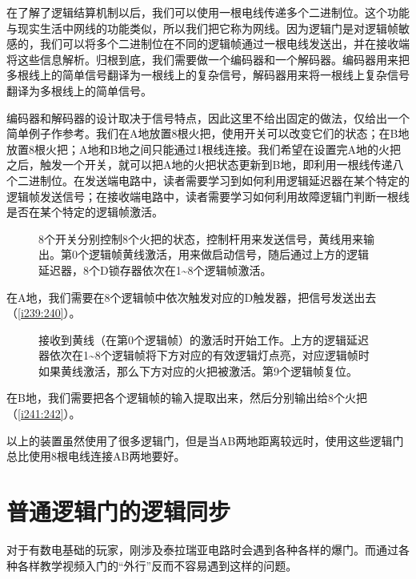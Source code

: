 在了解了逻辑结算机制以后，我们可以使用一根电线传递多个二进制位。这个功能与现实生活中网线的功能类似，所以我们把它称为网线。因为逻辑门是对逻辑帧敏感的，我们可以将多个二进制位在不同的逻辑帧通过一根电线发送出，并在接收端将这些信息解析。归根到底，我们需要做一个编码器和一个解码器。编码器用来把多根线上的简单信号翻译为一根线上的复杂信号，解码器用来将一根线上复杂信号翻译为多根线上的简单信号。

编码器和解码器的设计取决于信号特点，因此这里不给出固定的做法，仅给出一个简单例子作参考。我们在A地放置8根火把，使用开关可以改变它们的状态；在B地放置8根火把；A地和B地之间只能通过1根线连接。我们希望在设置完A地的火把之后，触发一个开关，就可以把A地的火把状态更新到B地，即利用一根线传递八个二进制位。在发送端电路中，读者需要学习到如何利用逻辑延迟器在某个特定的逻辑帧发送信号；在接收端电路中，读者需要学习如何利用故障逻辑门判断一根线是否在某个特定的逻辑帧激活。

\begin{figure}[!ht]
  \centering
  \caption{8个开关分别控制8个火把的状态，控制杆用来发送信号，黄线用来输出。第0个逻辑帧黄线激活，用来做启动信号，随后通过上方的逻辑延迟器，8个D锁存器依次在1\~{}8个逻辑帧激活。}
  \label{i239:240}
\end{figure}

在A地，我们需要在8个逻辑帧中依次触发对应的D触发器，把信号发送出去（\autoref{i239:240}）。

\begin{figure}[!ht]
  \centering
  \caption{接收到黄线（在第0个逻辑帧）的激活时开始工作。上方的逻辑延迟器依次在1\~{}8个逻辑帧将下方对应的有效逻辑灯点亮，对应逻辑帧时如果黄线激活，那么下方对应的火把被激活。第9个逻辑帧复位。}
  \label{i241:242}
\end{figure}

在B地，我们需要把各个逻辑帧的输入提取出来，然后分别输出给8个火把（\autoref{i241:242}）。

以上的装置虽然使用了很多逻辑门，但是当AB两地距离较远时，使用这些逻辑门总比使用8根电线连接AB两地要好。

\section{普通逻辑门的逻辑同步}
对于有数电基础的玩家，刚涉及泰拉瑞亚电路时会遇到各种各样的爆门。而通过各种各样教学视频入门的“外行”反而不容易遇到这样的问题。

